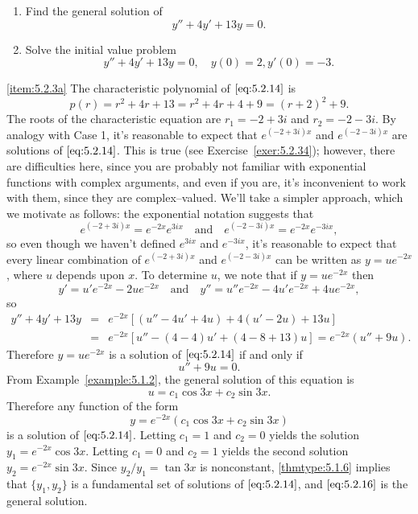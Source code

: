 \documentclass{ximera}
\begin{document}
\begin{example}\label{example:5.2.3}
\begin{enumerate}
\item \label{item:5.2.3a}%
Find the general solution of
\begin{equation} \label{eq:5.2.14}
y''+4y'+13y=0.
\end{equation}
 
\item \label{item:5.2.3b}%
Solve the initial value problem
\begin{equation} \label{eq:5.2.15}
y''+4y'+13y=0, \quad   y(0)=2,  y'(0)=-3.
\end{equation}
\end{enumerate}
 
\begin{explanation}
\ref{item:5.2.3a} The characteristic
polynomial of
$\eqref{eq:5.2.14}$ is
$$
p(r)=r^2+4r+13=r^2+4r+4+9=(r+2)^2+9.
$$
The roots of the characteristic equation are $r_1=-2+3i$ and
$r_2=-2-3i$. By analogy with Case 1, it's reasonable to expect that
$e^{(-2+3i)x}$ and $e^{(-2-3i)x}$ are solutions of $\eqref{eq:5.2.14}$. This
is true (see Exercise~\ref{exer:5.2.34});    
however, there are
difficulties here, since you are probably not familiar with
exponential functions with complex arguments, and even if you are, it's
 inconvenient to work with them, since they are complex--valued. We'll
 take a simpler approach, which we motivate as follows: the
exponential notation suggests that
$$
e^{(-2+3i)x}=e^{-2x}e^{3ix}\quad\mbox{and}\quad
e^{(-2-3i)x}=e^{-2x}e^{-3ix},
$$
so even though we haven't defined $e^{3ix}$ and $e^{-3ix}$, it's
reasonable to expect that every linear
combination of $e^{(-2+3i)x}$ and $e^{(-2-3i)x}$ can be written as
$y=ue^{-2x}$, where $u$ depends upon $x$. To determine $u$, we note
that if $y=ue^{-2x}$ then
$$
y'=u'e^{-2x}-2ue^{-2x}\quad\mbox{and}\quad
y''=u''e^{-2x}-4u'e^{-2x}+4ue^{-2x},
$$
so
\begin{eqnarray*}
y''+4y'+13y&=&e^{-2x}\left[(u''-4u'+4u)+4(u'-2u)+13u\right]\\
&=&e^{-2x}\left[u''-(4-4)u'+(4-8+13)u\right]=e^{-2x}(u''+9u).
\end{eqnarray*}
Therefore $y=ue^{-2x}$ is a solution of $\eqref{eq:5.2.14}$ if and only if
$$
u''+9u=0.
$$
From Example~\ref{example:5.1.2}, the  general solution of this equation is
$$
u=c_1\cos 3x +c_2\sin 3x.
$$
 Therefore any function of the form
\begin{equation} \label{eq:5.2.16}
y=e^{-2x}(c_1\cos 3x+c_2\sin 3x)
\end{equation}
is  a solution of $\eqref{eq:5.2.14}$.
Letting $c_1=1$ and $c_2=0$  yields the solution
 $y_1=e^{-2x}\cos3x$. Letting $c_1=0$ and $c_2=1$
yields the second solution $y_2=e^{-2x}\sin3x$. Since
$y_2/y_1=\tan3x$
is nonconstant, \ref{thmtype:5.1.6} implies that   $\{y_1,y_2\}$ is
a fundamental set of solutions of $\eqref{eq:5.2.14}$, and $\eqref{eq:5.2.16}$
is the general solution.
 

\end{explanation}
\end{example}
\end{document}
